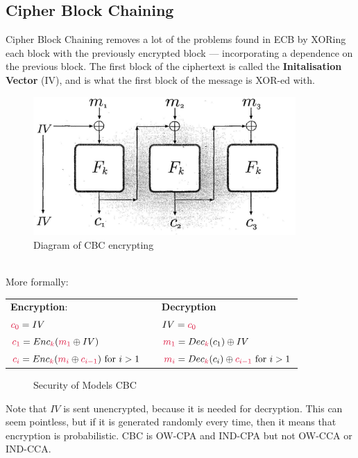     \subsection{Cipher Block Chaining}
    Cipher Block Chaining removes a lot of the problems found in ECB by XORing each block with the previously encrypted block --- incorporating a dependence on the previous block. The first block of the ciphertext is called the \textbf{Initalisation Vector} (IV), and is what the first block of the message is XOR-ed with.\\
    \begin{figure}[htp!]
        \centering
        \includegraphics[width=10cm]{img/cbc}
        \caption{Diagram of CBC encrypting}
    \end{figure}
    \\
    More formally:\nopagebreak
    \begin{center}
    \begin{tabular}{lll}
    \textbf{Encryption}:                                        && \textbf{Decryption}\\
    $\csubc{0} = IV$                                                  && $IV = \csubc{0}$\\
    $\csubc{1} = Enc_\ck(\csubm{1} \oplus IV)$                                && $\csubm{1} = Dec_\ck(c_1) \oplus IV$\\
    $\csubc{i} = Enc_\ck(\csubm{i} \oplus \csubc{i-1}) \textrm{ for } i > 1$      && $\csubm{i} = Dec_\ck(c_i) \oplus \csubc{i-1} \textrm{ for } i > 1$\\
    \end{tabular}
    \end{center}
    \begin{figure}[htp!]
        \centering
        \caption{Security of Models CBC}
        \label{fig:cbc-attacktable}
    \end{figure}
    Note that $IV$ is sent unencrypted, because it is needed for decryption. This can seem pointless, but if it is generated randomly every time, then it means that encryption is probabilistic. CBC is OW-CPA and IND-CPA but not OW-CCA or IND-CCA.\\
